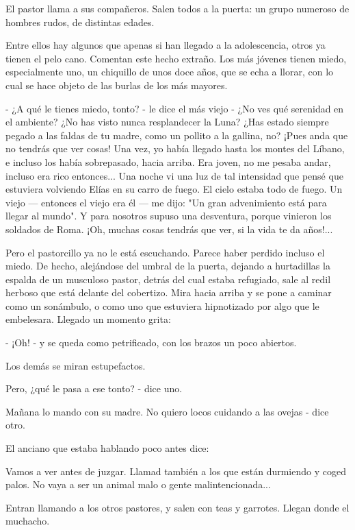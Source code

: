 \documentclass[12pt, twoside, openright]{book} %
\begin{document}
El pastor llama a sus compañeros. Salen todos a la puerta: un grupo numeroso de hombres rudos, de distintas edades. 

Entre ellos hay algunos que apenas si han llegado a la adolescencia, otros ya tienen el pelo cano. Comentan este hecho extraño. Los más jóvenes tienen miedo, especialmente uno, un chiquillo de unos doce años, que se echa a llorar, con lo cual se hace objeto de las burlas de los más mayores. 

- ¿A qué le tienes miedo, tonto? - le dice el más viejo - ¿No ves qué serenidad en el ambiente? ¿No has visto nunca resplandecer la Luna? ¿Has estado siempre pegado a las faldas de tu madre, como un pollito a la gallina, no? ¡Pues anda que no tendrás que ver cosas! Una vez, yo había llegado hasta los montes del Líbano, e incluso los había sobrepasado, hacia arriba. Era joven, no me pesaba andar, incluso era rico entonces... Una noche vi una luz de tal intensidad que pensé que estuviera volviendo Elías en su carro de fuego. El cielo estaba todo de fuego. Un viejo — entonces el viejo era él — me dijo: "Un gran advenimiento está para llegar al mundo". Y para nosotros supuso una desventura, porque vinieron los soldados de Roma. ¡Oh, muchas cosas tendrás que ver, si la vida te da años!... 

Pero el pastorcillo ya no le está escuchando. Parece haber perdido incluso el miedo. De hecho, alejándose del umbral de la puerta, dejando a hurtadillas la espalda de un musculoso pastor, detrás del cual estaba refugiado, sale al redil herboso que está delante del cobertizo. Mira hacia arriba y se pone a caminar como un sonámbulo, o como uno que estuviera hipnotizado por algo que le embelesara. Llegado un momento grita: 

- ¡Oh! - y se queda como petrificado, con los brazos un poco abiertos. 

Los demás se miran estupefactos. 

Pero, ¿qué le pasa a ese tonto? - dice uno. 

Mañana lo mando con su madre. No quiero locos cuidando a las ovejas - dice otro. 

El anciano que estaba hablando poco antes dice: 

Vamos a ver antes de juzgar. Llamad también a los que están durmiendo y coged palos. No vaya a ser un animal malo o gente malintencionada... 

Entran llamando a los otros pastores, y salen con teas y garrotes. Llegan donde el muchacho. 
\end{document}
